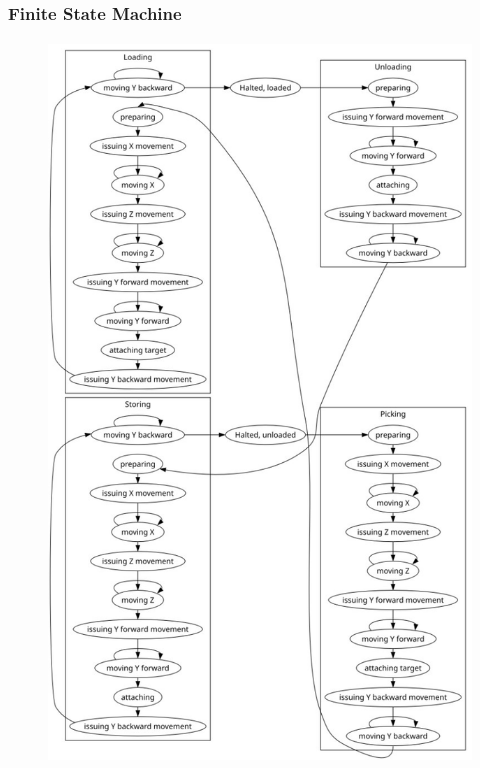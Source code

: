 \documentclass[12pt]{beamer}
\begin{document}
\begin{frame}
\frametitle{Finite State Machine}
\framesubtitle{}
\begin{figure}
    \centering
    \includegraphics[trim={0 0 0 0}, clip, scale=.21]{img/fsm.jpg}
    \label{fig:state_machine}
\end{figure}
\end{frame}
\end{document}
